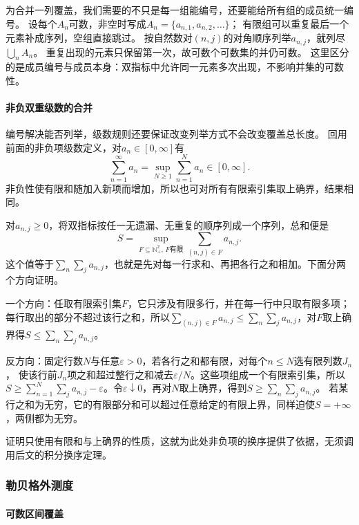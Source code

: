 为合并一列覆盖，我们需要的不只是每一组能编号，还要能给所有组的成员统一编号。
设每个$A_n$可数，非空时写成$A_n=\{a_{n,1},a_{n,2},\ldots\}$；
有限组可以重复最后一个元素补成序列，空组直接跳过。
按自然数对$(n,j)$的对角顺序列举$a_{n,j}$，就列尽$\bigcup_n A_n$。
重复出现的元素只保留第一次，故可数个可数集的并仍可数。
这里区分的是成员编号与成员本身：双指标中允许同一元素多次出现，不影响并集的可数性。

\paragraph{非负双重级数的合并}

编号解决能否列举，级数规则还要保证改变列举方式不会改变覆盖总长度。
回用前面的非负项级数定义，对$a_n\in[0,\infty]$有
\begin{equation}
 \sum_{n=1}^{\infty}a_n
 =\sup_{N\geq1}\sum_{n=1}^Na_n\in[0,\infty].
 \label{eq:comb-nonnegative-sum-supremum}
\end{equation}
非负性使有限和随加入新项而增加，所以也可对所有有限索引集取上确界，结果相同。

对$a_{n,j}\geq0$，将双指标按任一无遗漏、无重复的顺序列成一个序列，总和便是
\[
 S=\sup_{F\subseteq\mathbb N_+^2,\,F\text{有限}}
          \sum_{(n,j)\in F}a_{n,j}.
\]
这个值等于$\sum_n\sum_j a_{n,j}$，也就是先对每一行求和、再把各行之和相加。下面分两个方向证明。

一个方向：任取有限索引集$F$，它只涉及有限多行，并在每一行中只取有限多项；
每行取出的部分不超过该行之和，所以$\sum_{(n,j)\in F}a_{n,j}\leq\sum_n\sum_ja_{n,j}$，对$F$取上确界得$S\leq\sum_n\sum_ja_{n,j}$。

反方向：固定行数$N$与任意$\varepsilon>0$，若各行之和都有限，对每个$n\leq N$选有限列数$J_n$，
使该行前$J_n$项之和超过整行之和减去$\varepsilon/N$。这些项组成一个有限索引集，所以
$S\geq\sum_{n=1}^N\sum_ja_{n,j}-\varepsilon$。令$\varepsilon\downarrow0$，再对$N$取上确界，得到$S\geq\sum_n\sum_ja_{n,j}$。
若某行之和为无穷，它的有限部分和可以超过任意给定的有限上界，同样迫使$S=+\infty$，两侧都为无穷。

证明只使用有限和与上确界的性质，这就为此处非负项的换序提供了依据，无须调用后文的积分换序定理。

\subsubsection{勒贝格外测度}
\label{sec:comb-length-and-lebesgue-measure}

\paragraph{可数区间覆盖}

